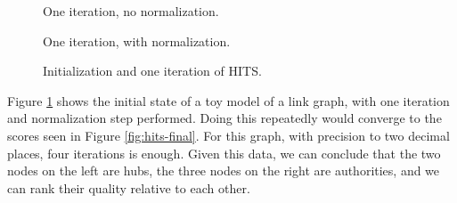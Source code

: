 \documentclass[11pt]{article}
\begin{document}
\begin{figure}[ht]
\begin{minipage}{0.32\textwidth}
\begin{tikzpicture}[->,>=stealth',shorten >=1pt,auto,thick,scale=0.9]
        \end{tikzpicture}
        \caption*{\scriptsize One iteration, no normalization.}
    \end{minipage}
    \hfill
    \begin{minipage}{0.32\textwidth}
        \centering
        \caption*{\scriptsize One iteration, with normalization.}
    \end{minipage}
    \caption{Initialization and one iteration of HITS.}
    \label{fig:hits-three}
\end{figure}

Figure \ref{fig:hits-three} shows the initial state of a toy model of a link graph, with one iteration and normalization step performed.
Doing this repeatedly would converge to the scores seen in Figure \ref{fig:hits-final}.
For this graph, with precision to two decimal places, four iterations is enough.
Given this data, we can conclude that the two nodes on the left are hubs, the three nodes on the right are authorities, and we can rank their quality relative to each other.
\end{document}
